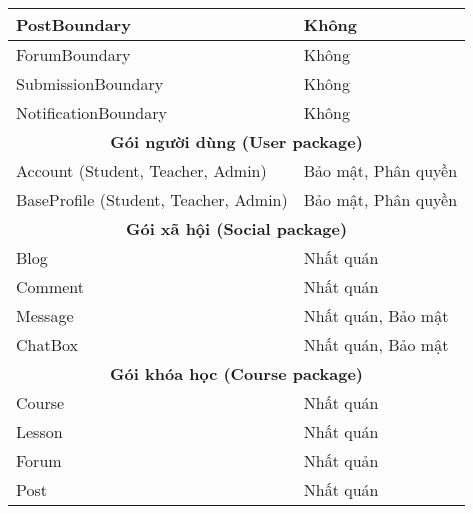 \documentclass[./../main_file.tex]{subfiles}
\begin{document}
\begin{longtable}{|p{}|p{}|}
			PostBoundary                          & Không                                                         \\ \hline
			ForumBoundary                         & Không                                                         \\ \hline
			SubmissionBoundary                    & Không                                                         \\ \hline
			NotificationBoundary                  & Không                                                         \\ \hline
			\multicolumn{2}{|c|}{\textbf{Gói người dùng (User package)}}                                          \\ \hline
			Account (Student, Teacher, Admin)     & Bảo mật, Phân quyền                                           \\ \hline
			BaseProfile (Student, Teacher, Admin) & Bảo mật, Phân quyền                                           \\ \hline
			\multicolumn{2}{|c|}{\textbf{Gói xã hội (Social package)}}                                            \\ \hline
			Blog                                  & Nhất quán                                                     \\ \hline
			Comment                               & Nhất quán                                                     \\ \hline
			Message                               & Nhất quán, Bảo mật                                            \\ \hline
			ChatBox                               & Nhất quán, Bảo mật                                            \\ \hline
			\multicolumn{2}{|c|}{\textbf{Gói khóa học (Course package)}}                                          \\ \hline
			Course                                & Nhất quán                                                     \\ \hline
			Lesson                                & Nhất quán                                                     \\ \hline
			Forum                                 & Nhất quản                                                     \\ \hline
			Post                                  & Nhất quán                                                     \\ \hline

\end{longtable}
\end{document}
